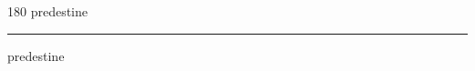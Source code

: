 
\begin{frame}
\begin{center}
\begin{turn}{180}
{\fontsize{2.5cm}{1em}\selectfont predestine}
\end{turn}
\vspace{1em}\par  
\hrule
\vspace{1em}\par  
{\fontsize{2.5cm}{1em}\selectfont predestine}
\end{center}
\end{frame}
